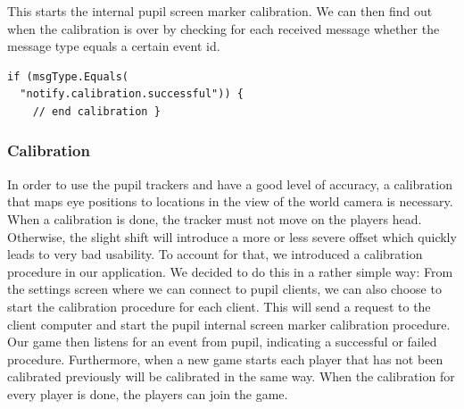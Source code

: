 \documentclass{sigchi}
\begin{document}
This starts the internal pupil screen marker calibration. We can then find out when the calibration is over by checking for each received message whether the message type equals a certain event id.
 \begin{verbatim}
if (msgType.Equals(
  "notify.calibration.successful")) {
    // end calibration }
\end{verbatim}

\subsubsection{Calibration}
In order to use the pupil trackers and have a good level of accuracy, a calibration that maps eye positions to locations in the view of the world camera is necessary. When a calibration is done, the tracker must not move on the players head. Otherwise, the slight shift will introduce a more or less severe offset which quickly leads to very bad usability. To account for that, we introduced a calibration procedure in our application. We decided to do this in a rather simple way: From the settings screen where we can connect to pupil clients, we can also choose to start the calibration procedure for each client. This will send a request to the client computer and start the pupil internal screen marker calibration procedure. Our game then listens for an event from pupil, indicating a successful or failed procedure. Furthermore, when a new game starts each player that has not been calibrated previously will be calibrated in the same way. When the calibration for every player is done, the players can join the game.
\end{document}

